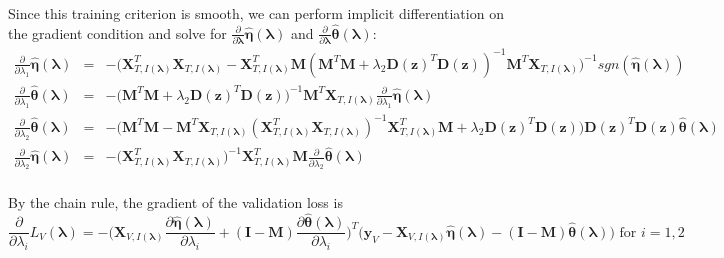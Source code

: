 \documentclass[10pt,letterpaper]{article}
\begin{document}
Since this training criterion is smooth, we can perform implicit differentiation on the gradient condition and solve for $\frac{\partial}{\partial \boldsymbol \lambda} \hat{\boldsymbol\eta}(\boldsymbol{\lambda}) $ and $\frac{\partial}{\partial \boldsymbol \lambda} \hat{\boldsymbol\theta}(\boldsymbol{\lambda}) $: 
\begin{equation*}
\begin{array}{lcl}
\frac{\partial}{\partial \lambda_1} \hat{\boldsymbol\eta}(\boldsymbol{\lambda})  &=&
-\bigg(\boldsymbol{X}_{T, I(\boldsymbol\lambda)}^T \boldsymbol{X}_{T, I(\boldsymbol\lambda)}
- \boldsymbol{X}_{T, I(\boldsymbol\lambda)}^T \boldsymbol{M}(\boldsymbol{M}^T \boldsymbol{M}
+ \lambda_2 \boldsymbol{D}(\boldsymbol{z})^T\boldsymbol{D}(\boldsymbol{z}))^{-1} \boldsymbol{M}^T \boldsymbol{X}_{T, I(\boldsymbol\lambda)} \bigg)^{-1} 
sgn( \hat{\boldsymbol\eta}(\boldsymbol{\lambda})) \\
\frac{\partial }{\partial \lambda_1} \hat{\boldsymbol\theta}(\boldsymbol{\lambda}) &=&
-\bigg(\boldsymbol{M}^T \boldsymbol{M}
+ \lambda_2 \boldsymbol{D}(\boldsymbol{z})^T \boldsymbol{D}(\boldsymbol{z})\bigg)^{-1}
\boldsymbol{M}^T \boldsymbol{X}_{T, I(\boldsymbol\lambda)} \frac{\partial}{\partial \lambda_1} \hat{\boldsymbol\eta}(\boldsymbol{\lambda})
\\
\frac{\partial}{\partial \lambda_2}  \hat{\boldsymbol\theta}(\boldsymbol{\lambda}) &=&
-\bigg(\boldsymbol{M}^T \boldsymbol{M}
- \boldsymbol{M}^T \boldsymbol{X}_{T, I(\boldsymbol\lambda)} (\boldsymbol{X}_{T, I(\boldsymbol\lambda)}^T\boldsymbol{X}_{T, I(\boldsymbol\lambda)})^{-1} \boldsymbol{X}_{T, I(\boldsymbol\lambda)}^T \boldsymbol{M} + \lambda_2 \boldsymbol{D}(\boldsymbol{z})^T\boldsymbol{D}(\boldsymbol{z}) \bigg)
\boldsymbol{D}(\boldsymbol{z})^T\boldsymbol{D}(\boldsymbol{z}) \hat{\boldsymbol\theta}(\boldsymbol{\lambda})
\\
\frac{\partial}{\partial \lambda_2} \hat{\boldsymbol\eta}(\boldsymbol{\lambda}) &=&
- \bigg( \boldsymbol{X}_{T, I(\boldsymbol\lambda)}^T\boldsymbol{X}_{T, I(\boldsymbol\lambda)}\bigg)^{-1}
\boldsymbol{X}_{T, I(\boldsymbol\lambda)}^T \boldsymbol{M}
\frac{\partial}{\partial \lambda_2}  \hat{\boldsymbol\theta}(\boldsymbol{\lambda})\\
\end{array}
\end{equation*}

By the chain rule, the gradient of the validation loss is
\begin{equation*}
\frac{\partial}{\partial \lambda_i} L_V(\boldsymbol{\lambda}) =
- \bigg(
\boldsymbol{X}_{V, I(\boldsymbol\lambda)} \frac{\partial \hat{\boldsymbol\eta}(\boldsymbol{\lambda})}{\partial \lambda_i}
+ (\boldsymbol I - \boldsymbol{M}) \frac{\partial \hat{\boldsymbol\theta}(\boldsymbol{\lambda})}{\partial \lambda_i}
\bigg )^T
\bigg (
\boldsymbol{y}_V
- \boldsymbol{X}_{V, I(\boldsymbol\lambda)} \hat{\boldsymbol\eta}(\boldsymbol{\lambda})
- (\boldsymbol I - \boldsymbol{M}) \hat{\boldsymbol\theta}(\boldsymbol{\lambda})
\bigg )
\text{ for } i = 1,2 
\end{equation*}
\end{document}
